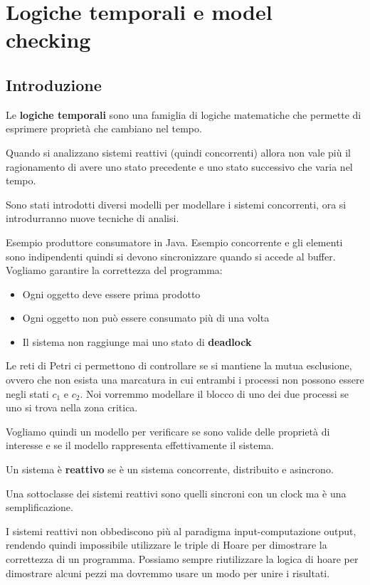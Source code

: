 \chapter{Logiche temporali e model checking}
\section{Introduzione}
Le \textbf{logiche temporali} sono una famiglia di logiche matematiche che
permette di esprimere proprietà che cambiano nel tempo.

Quando si analizzano sistemi reattivi (quindi concorrenti) allora non vale più
il ragionamento di avere uno stato precedente e uno stato successivo che varia nel
tempo.

Sono stati introdotti diversi modelli per modellare i sistemi concorrenti, ora
si introdurranno nuove tecniche di analisi.

Esempio produttore consumatore in Java. Esempio concorrente e gli elementi sono
indipendenti quindi si devono sincronizzare quando si accede al buffer. Vogliamo
garantire la correttezza del programma:
\begin{itemize}
    \item Ogni oggetto deve essere prima prodotto
    \item Ogni oggetto non può essere consumato più di una volta
    \item Il sistema non raggiunge mai uno stato di \textbf{deadlock}
\end{itemize}
Le reti di Petri ci permettono di controllare se si mantiene la mutua esclusione,
ovvero che non esista una  marcatura in cui entrambi i processi non possono essere
negli stati $c_1$ e $c_2$. Noi vorremmo modellare il blocco di uno dei due
processi se uno si trova nella zona critica.

Vogliamo quindi un modello per verificare se sono valide delle proprietà di
interesse e se il modello rappresenta effettivamente il sistema.
\begin{definizione}
    Un sistema è \textbf{reattivo} se è un sistema concorrente, distribuito e
    asincrono.
\end{definizione}
Una sottoclasse dei sistemi reattivi sono quelli sincroni con un clock ma è una
semplificazione.

I sistemi reattivi non obbediscono più al paradigma input-computazione output,
rendendo quindi impossibile utilizzare le triple di Hoare per dimostrare la
correttezza di un programma. Possiamo sempre riutilizzare la logica di hoare per
dimostrare alcuni pezzi ma dovremmo usare un modo per unire i risultati.

